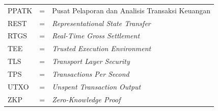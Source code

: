 \begin{tabular}{llp{9cm}}
PPATK & \hspace{1cm} = & Pusat Pelaporan dan Analisis Transaksi Keuangan \\
REST  & \hspace{1cm} = & \textit{Representational State Transfer} \\
RTGS  & \hspace{1cm} = & \textit{Real-Time Gross Settlement} \\
TEE   & \hspace{1cm} = & \textit{Trusted Execution Environment} \\
TLS   & \hspace{1cm} = & \textit{Transport Layer Security} \\
TPS   & \hspace{1cm} = & \textit{Transactions Per Second} \\
UTXO  & \hspace{1cm} = & \textit{Unspent Transaction Output} \\
ZKP   & \hspace{1cm} = & \textit{Zero-Knowledge Proof} \\
\end{tabular}
